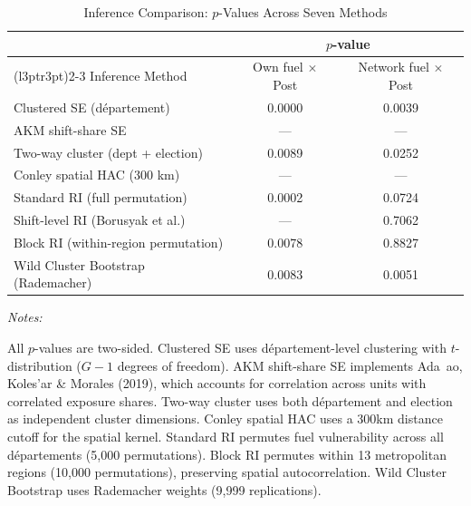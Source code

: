 \begin{table}[!h]
\centering
\caption{Inference Comparison: $p$-Values Across Seven Methods}
\centering
\fontsize{10}{12}\selectfont
\begin{threeparttable}
\begin{tabular}[t]{lcc}
\toprule
\multicolumn{1}{c}{ } & \multicolumn{2}{c}{$p$-value} \\
\cmidrule(l{3pt}r{3pt}){2-3}
Inference Method & Own fuel $\times$ Post & Network fuel $\times$ Post\\
\midrule
Clustered SE (département) & 0.0000 & 0.0039\\
AKM shift-share SE & --- & ---\\
Two-way cluster (dept + election) & 0.0089 & 0.0252\\
Conley spatial HAC (300 km) & --- & ---\\
Standard RI (full permutation) & 0.0002 & 0.0724\\
Shift-level RI (Borusyak et al.) & --- & 0.7062\\
Block RI (within-region permutation) & 0.0078 & 0.8827\\
Wild Cluster Bootstrap (Rademacher) & 0.0083 & 0.0051\\
\bottomrule
\end{tabular}
\begin{tablenotes}
\item \textit{Notes:} 
\item All $p$-values are two-sided. Clustered SE uses d\'{e}partement-level clustering with $t$-distribution ($G-1$ degrees of freedom). AKM shift-share SE implements Ada~{a}o, Koles'{a}r \& Morales (2019), which accounts for correlation across units with correlated exposure shares. Two-way cluster uses both d\'{e}partement and election as independent cluster dimensions. Conley spatial HAC uses a 300km distance cutoff for the spatial kernel. Standard RI permutes fuel vulnerability across all d\'{e}partements (5,000 permutations). Block RI permutes within 13 metropolitan regions (10,000 permutations), preserving spatial autocorrelation. Wild Cluster Bootstrap uses Rademacher weights (9,999 replications).
\end{tablenotes}
\end{threeparttable}
\end{table}
